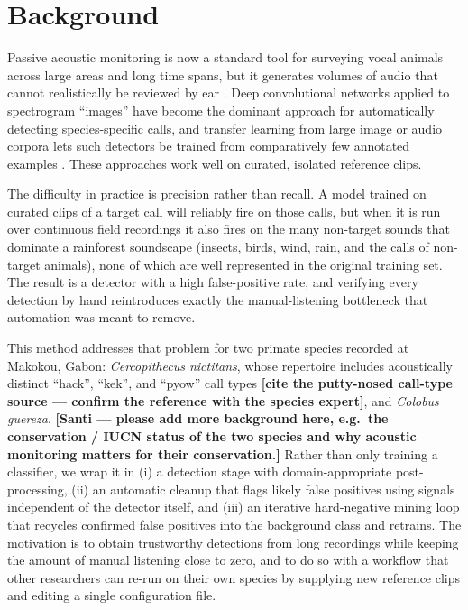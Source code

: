 \documentclass[final,3p,times]{elsarticle}
\begin{document}
\section*{Background}

Passive acoustic monitoring is now a standard tool for surveying vocal animals
across large areas and long time spans, but it generates volumes of audio that
cannot realistically be reviewed by ear \cite{cauzinille2024}. Deep convolutional
networks applied to spectrogram ``images'' have become the dominant approach
for automatically detecting species-specific calls, and transfer learning from
large image or audio corpora lets such detectors be trained from comparatively
few annotated examples \cite{sun2022}. These approaches work well
on curated, isolated reference clips.

The difficulty in practice is precision rather than recall. A model trained on
curated clips of a target call will reliably fire on those calls, but when it
is run over continuous field recordings it also fires on the many non-target
sounds that dominate a rainforest soundscape (insects, birds, wind, rain,
and the calls of non-target animals), none of which are well represented in
the original training set. The result is a detector with a high false-positive
rate, and verifying every detection by hand reintroduces exactly the
manual-listening bottleneck that automation was meant to remove.

This method addresses that problem for two primate species recorded at
Makokou, Gabon: \textit{Cercopithecus nictitans},
whose repertoire includes acoustically distinct ``hack'', ``kek'', and
``pyow'' call types \textbf{[cite the putty-nosed call-type source --- confirm
the reference with the species expert]}, and \textit{Colobus guereza}.
\textbf{[Santi --- please add more background here, e.g.\ the conservation /
IUCN status of the two species and why acoustic monitoring matters for their
conservation.]}
Rather
than only training a classifier, we wrap it in (i) a detection stage with
domain-appropriate post-processing, (ii) an automatic cleanup that flags
likely false positives using signals independent of the detector itself, and
(iii) an iterative hard-negative mining loop that recycles
confirmed false positives into the background class and retrains. The
motivation is to obtain trustworthy detections from long recordings while
keeping the amount of manual listening close to zero, and to do so with a
workflow that other researchers can re-run on their own species by supplying
new reference clips and editing a single configuration file.
\end{document}
